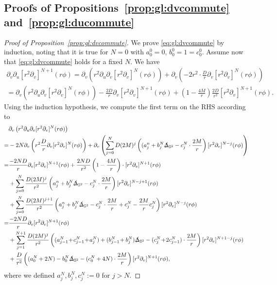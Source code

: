 \documentclass[11pt,english]{article}
\numberwithin{equation}{section}
\theoremstyle{remark}
\theoremstyle{plain}
\theoremstyle{remark}
\newcommand{\pu}{\partial_u}
\newcommand{\pv}{\partial_v}
\renewcommand{\(}{\left(}
\renewcommand{\)}{\right)}
\begin{document}
\subsection{Proofs of Propositions~\ref{prop:gl:dvcommute} and~\ref{prop:gl:ducommute}}\label{A1}
\begin{proof}[Proof of Proposition~\ref{prop:gl:dvcommute}]
We prove \eqref{eq:gl:dvcommute} by induction, noting that it is true for $N=0$ with $a_0^0=0$, $b_0^0=1=c_0^0$. Assume now that \eqref{eq:gl:dvcommute} holds for a fixed $N$. 
We have 
\begin{multline}\label{appeq1}
\pv\pu[r^2\pv]^{N+1}(r\phi)=\pv\left(r^2\pu\pv[r^2\pv]^N(r\phi)\right)+\pv \left(-2r^2\cdot\frac{D}{r}\pv[r^2\pv]^N(r\phi)\right)\\
=\pv\left(r^2\pu\pv[r^2\pv]^N(r\phi)\right)-\frac{2D}{r}\pv[r^2\pv]^{N+1}(r\phi)+\left(1-\frac{4M}{r}\right)\frac{2D}{r^2}[r^2\pv]^{N+1}(r\phi).
\end{multline}
Using the induction hypothesis, we compute the first term on the RHS according to
\begin{align}
\begin{split}
&\pv\left(r^2\pu\pv[r^2\pv]^N(r\phi)\right)\\
=&-2N\pv\left(r^2\frac{D}{r}\pv[r^2\pv]^N(r\phi)\right)
+\pv\left(\sum_{j=0}^ND(2M)^j\left((a_j^n+b_j^N\slashed{\Delta}_{\mathbb{S}^2}-c_j^N\cdot\frac{2M}{r}\right)[r^2\pv]^{N-j}(r\phi)\right)\\
=&\frac{-2ND}{r}\pv[r^2\pv]^{N+1}(r\phi)+\frac{2ND}{r^2}\left(1-\frac{4M}{r}\right)\cdot[r^2\pv]^{N+1}(r\phi)\\
		&+\sum_{j=0}^N\frac{D(2M)^j}{r^2}\left(a_j^n+b_j^N\slashed{\Delta}_{\mathbb{S}^2}-c_j^N\cdot\frac{2M}{r}\right)[r^2\pv]^{N-j+1}(r\phi)\\
		&+\sum_{j=0}^N
\frac{D(2M)^{j+1}}{r^2}\left(a_j^n+b_j^N\slashed{\Delta}_{\mathbb{S}^2}-c_j^N\cdot\frac{2M}{r}+c_j^N-\frac{2M}{r}c_j^N\right)[r^2\pv]^{N-j}(r\phi)\\
=&\frac{-2ND}{r}\pv[r^2\pv]^{N+1}(r\phi)\\
	&+\sum_{j=1}^{N+1}\frac{D(2M)^j}{r^2}\left((a_{j-1}^N\!+\!c_{j-1}^N\!+\!a_j^{N})+(b_{j-1}^N\!+b_j^N)\slashed{\Delta}_{\mathbb{S}^2}-(c_{j}^N\!+\!2c_{j-1}^N)\cdot\frac{2M}{r}\right)[r^2\pv]^{N+1-j}(r\phi)\\
	&+\frac{D}{r^2}\left((a_0^N+2N)-b_0^N\slashed{\Delta}_{\mathbb{S}^2}-(c_0^N+4N)\cdot\frac{2M}{r}\right)[r^2\pv]^{N+1}(r\phi),
\end{split}
\end{align}
where we defined $a_j^N, b_j^N, c_j^N:=0$ for $j>N$.


\end{proof}
\end{document}

